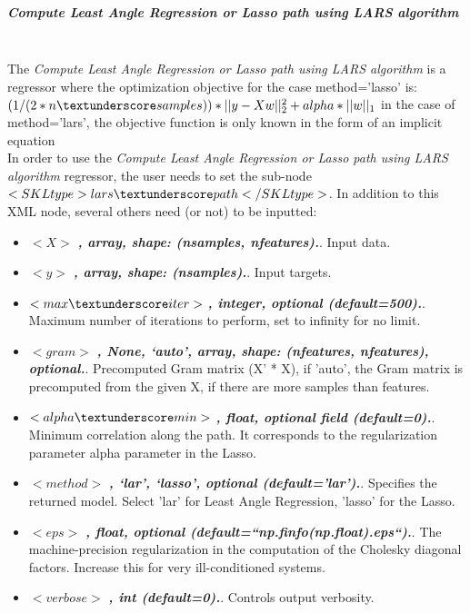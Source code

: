 \subparagraph{Compute Least Angle Regression or Lasso path using LARS algorithm}
\mbox{}
\\The \textit{Compute Least Angle Regression or Lasso path using LARS algorithm} is a regressor where the optimization objective for the case method=’lasso’ is:
$(1 / (2 * n\textunderscore samples)) * ||y - Xw||^2_2 + alpha * ||w||_1$
in the case of method=’lars’, the objective function is only known in the form of an implicit equation
\\In order to use the \textit{Compute Least Angle Regression or Lasso path using LARS algorithm} regressor, the user needs to set the sub-node $<SKLtype>lars\textunderscore path</SKLtype>$.
In addition to this XML node, several others need (or not) to be inputted:
\begin{itemize}
  \item $<X>$ \textbf{\textit{, array, shape: (n\textunderscore samples, n\textunderscore features).}}. Input data.
  \item $<y>$ \textbf{\textit{, array, shape: (n\textunderscore samples).}}. Input targets.
  \item $<max\textunderscore iter>$ \textbf{\textit{, integer, optional (default=500).}}. Maximum number of iterations to perform, set to infinity for no limit.
  \item $<gram>$ \textbf{\textit{, None, ‘auto’, array, shape: (n\textunderscore features, n\textunderscore features), optional.}}. Precomputed Gram matrix (X’ * X), if 'auto', the Gram matrix is precomputed from the given X, if there are more samples than features.
  \item $<alpha\textunderscore min>$ \textbf{\textit{, float, optional field (default=0).}}. Minimum correlation along the path. It corresponds to the regularization parameter alpha parameter in the Lasso.
  \item $<method>$ \textbf{\textit{, {‘lar’, ‘lasso’}, optional (default=’lar’).}}. Specifies the returned model. Select 'lar' for Least Angle Regression, 'lasso' for the Lasso.
  \item $<eps>$ \textbf{\textit{, float, optional (default=``np.finfo(np.float).eps``).}}. The machine-precision regularization in the computation of the Cholesky diagonal factors. Increase this for very ill-conditioned systems.
  \item $<verbose>$ \textbf{\textit{, int (default=0).}}. Controls output verbosity.
\end{itemize}

